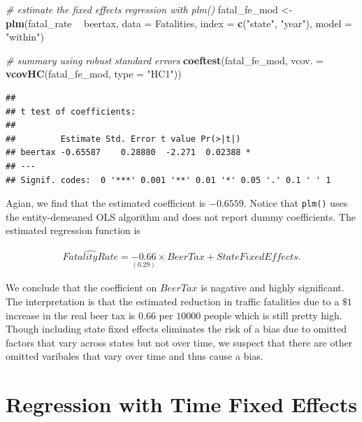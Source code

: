 \documentclass[]{book}
\newenvironment{Shaded}{\begin{snugshade}}{\end{snugshade}}
\newcommand{\KeywordTok}[1]{\textcolor[rgb]{0.13,0.29,0.53}{\textbf{#1}}}
\newcommand{\DataTypeTok}[1]{\textcolor[rgb]{0.13,0.29,0.53}{#1}}
\newcommand{\StringTok}[1]{\textcolor[rgb]{0.31,0.60,0.02}{#1}}
\newcommand{\CommentTok}[1]{\textcolor[rgb]{0.56,0.35,0.01}{\textit{#1}}}
\newcommand{\OperatorTok}[1]{\textcolor[rgb]{0.81,0.36,0.00}{\textbf{#1}}}
\newcommand{\NormalTok}[1]{#1}
\theoremstyle{definition}
\theoremstyle{definition}
\theoremstyle{definition}
\theoremstyle{remark}
\begin{document}
\begin{Shaded}
\begin{Highlighting}[]
\CommentTok{# estimate the fixed effects regression with plm()}
\NormalTok{fatal_fe_mod <-}\StringTok{ }\KeywordTok{plm}\NormalTok{(fatal_rate }\OperatorTok{~}\StringTok{ }\NormalTok{beertax, }
                    \DataTypeTok{data =}\NormalTok{ Fatalities,}
                    \DataTypeTok{index =} \KeywordTok{c}\NormalTok{(}\StringTok{"state"}\NormalTok{, }\StringTok{"year"}\NormalTok{), }
                    \DataTypeTok{model =} \StringTok{"within"}\NormalTok{)}

\CommentTok{# summary using robust standard errors}
\KeywordTok{coeftest}\NormalTok{(fatal_fe_mod, }\DataTypeTok{vcov. =} \KeywordTok{vcovHC}\NormalTok{(fatal_fe_mod, }\DataTypeTok{type =} \StringTok{"HC1"}\NormalTok{))}
\end{Highlighting}
\end{Shaded}

\begin{verbatim}
## 
## t test of coefficients:
## 
##         Estimate Std. Error t value Pr(>|t|)  
## beertax -0.65587    0.28880  -2.271  0.02388 *
## ---
## Signif. codes:  0 '***' 0.001 '**' 0.01 '*' 0.05 '.' 0.1 ' ' 1
\end{verbatim}

Agian, we find that the estimated coefficient is \(-0.6559\). Notice
that \texttt{plm()} uses the entity-demeaned OLS algorithm and does not
report dummy coefficients. The estimated regression function is

\begin{align}
\widehat{FatalityRate} = \underset{(0.29)}{-0.66} \times BeerTax + StateFixedEffects. \label{eq:efemod}
\end{align}

We conclude that the coefficient on \(BeerTax\) is nagative and highly
significant. The interpretation is that the estimated reduction in
traffic fatalities due to a \(\$1\) increase in the real beer tax is
\(0.66\) per \(10000\) people which is still pretty high. Though
including state fixed effects eliminates the risk of a bias due to
omitted factors that vary across states but not over time, we suspect
that there are other omitted varibales that vary over time and thus
cause a bias.

\section{Regression with Time Fixed
Effects}\label{regression-with-time-fixed-effects}
\end{document}
